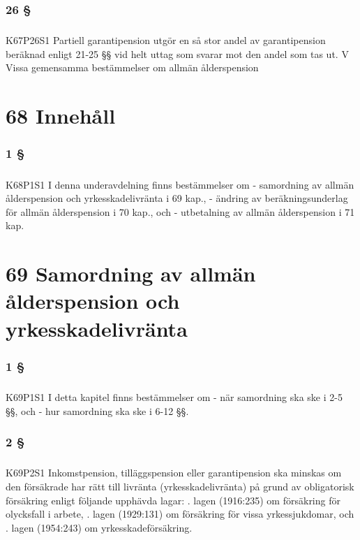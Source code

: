 \documentclass[a4paper,notitlepage,openany,10pt]{book}
\begin{document}
\subsection*{26 §}
\paragraph*{}
{\tiny K67P26S1}
Partiell garantipension utgör en så stor andel av garantipension beräknad enligt 21-25 §§ vid helt uttag som svarar mot den andel som tas ut.
V Vissa gemensamma bestämmelser om allmän ålderspension
\chapter*{68 Innehåll}
\subsection*{1 §}
\paragraph*{}
{\tiny K68P1S1}
I denna underavdelning finns bestämmelser om
\newline - samordning av allmän ålderspension och yrkesskadelivränta i 69 kap.,
\newline - ändring av beräkningsunderlag för allmän ålderspension i 70 kap., och
\newline - utbetalning av allmän ålderspension i 71 kap.
\chapter*{69 Samordning av allmän ålderspension och yrkesskadelivränta}
\subsection*{1 §}
\paragraph*{}
{\tiny K69P1S1}
I detta kapitel finns bestämmelser om
\newline - när samordning ska ske i 2-5 §§, och
\newline - hur samordning ska ske i 6-12 §§.
\subsection*{2 §}
\paragraph*{}
{\tiny K69P2S1}
Inkomstpension, tilläggspension eller garantipension ska minskas om den försäkrade har rätt till livränta (yrkesskadelivränta) på grund av obligatorisk försäkring enligt följande upphävda lagar:
. lagen (1916:235) om försäkring för olycksfall i arbete,
. lagen (1929:131) om försäkring för vissa yrkessjukdomar, och
. lagen (1954:243) om yrkesskadeförsäkring.
\end{document}
